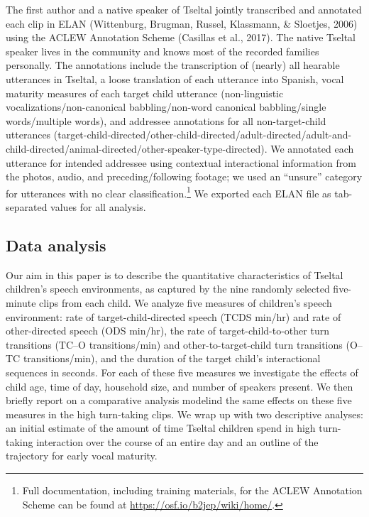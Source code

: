 \documentclass[floatsintext,man]{apa6}
\theoremstyle{definition}
\theoremstyle{definition}
\theoremstyle{definition}
\theoremstyle{remark}
\begin{document}
The first author and a native speaker of Tseltal jointly transcribed and
annotated each clip in ELAN (Wittenburg, Brugman, Russel, Klassmann, \&
Sloetjes, 2006) using the ACLEW Annotation Scheme (Casillas et al.,
2017). The native Tseltal speaker lives in the community and knows most
of the recorded families personally. The annotations include the
transcription of (nearly) all hearable utterances in Tseltal, a loose
translation of each utterance into Spanish, vocal maturity measures of
each target child utterance (non-linguistic vocalizations/non-canonical
babbling/non-word canonical babbling/single words/multiple words), and
addressee annotations for all non-target-child utterances
(target-child-directed/other-child-directed/adult-directed/adult-and-child-directed/animal-directed/other-speaker-type-directed).
We annotated each utterance for intended addressee using contextual
interactional information from the photos, audio, and
preceding/following footage; we used an \enquote{unsure} category for
utterances with no clear classification.\footnote{Full documentation,
  including training materials, for the ACLEW Annotation Scheme can be
  found at \url{https://osf.io/b2jep/wiki/home/}.} We exported each ELAN
file as tab-separated values for all analysis.

\subsection{Data analysis}\label{methods-analysisinfo}

Our aim in this paper is to describe the quantitative characteristics of
Tseltal children's speech environments, as captured by the nine randomly
selected five-minute clips from each child. We analyze five measures of
children's speech environment: rate of target-child-directed speech
(TCDS min/hr) and rate of other-directed speech (ODS min/hr), the rate
of target-child-to-other turn transitions (TC--O transitions/min) and
other-to-target-child turn transitions (O--TC transitions/min), and the
duration of the target child's interactional sequences in seconds. For
each of these five measures we investigate the effects of child age,
time of day, household size, and number of speakers present. We then
briefly report on a comparative analysis modelind the same effects on
these five measures in the high turn-taking clips. We wrap up with two
descriptive analyses: an initial estimate of the amount of time Tseltal
children spend in high turn-taking interaction over the course of an
entire day and an outline of the trajectory for early vocal maturity.
\end{document}
